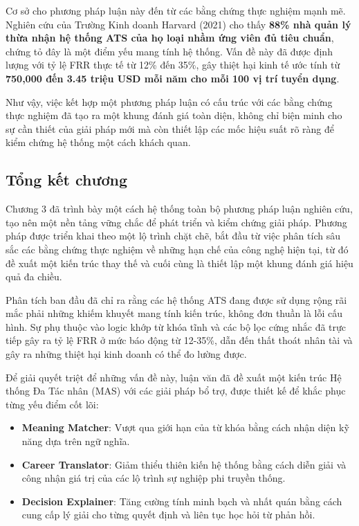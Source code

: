 \documentclass{article}
\begin{document}
Cơ sở cho phương pháp luận này đến từ các bằng chứng thực nghiệm mạnh mẽ. Nghiên cứu của Trường Kinh doanh Harvard (2021) cho thấy \textbf{88\% nhà quản lý thừa nhận hệ thống ATS của họ loại nhầm ứng viên đủ tiêu chuẩn}, chứng tỏ đây là một điểm yếu mang tính hệ thống. Vấn đề này đã được định lượng với tỷ lệ FRR thực tế từ 12\% đến 35\%, gây thiệt hại kinh tế ước tính từ \textbf{750,000 đến 3.45 triệu USD mỗi năm cho mỗi 100 vị trí tuyển dụng}.

Như vậy, việc kết hợp một phương pháp luận có cấu trúc với các bằng chứng thực nghiệm đã tạo ra một khung đánh giá toàn diện, không chỉ biện minh cho sự cần thiết của giải pháp mới mà còn thiết lập các mốc hiệu suất rõ ràng để kiểm chứng hệ thống một cách khách quan.

\subsection{Tổng kết chương}
Chương 3 đã trình bày một cách hệ thống toàn bộ phương pháp luận nghiên cứu, tạo nên một nền tảng vững chắc để phát triển và kiểm chứng giải pháp. Phương pháp được triển khai theo một lộ trình chặt chẽ, bắt đầu từ việc phân tích sâu sắc các bằng chứng thực nghiệm về những hạn chế của công nghệ hiện tại, từ đó đề xuất một kiến trúc thay thế và cuối cùng là thiết lập một khung đánh giá hiệu quả đa chiều.

Phân tích ban đầu đã chỉ ra rằng các hệ thống ATS đang được sử dụng rộng rãi mắc phải những khiếm khuyết mang tính kiến trúc, không đơn thuần là lỗi cấu hình. Sự phụ thuộc vào logic khớp từ khóa tĩnh và các bộ lọc cứng nhắc đã trực tiếp gây ra tỷ lệ FRR ở mức báo động từ 12-35\%, dẫn đến thất thoát nhân tài và gây ra những thiệt hại kinh doanh có thể đo lường được. 

Để giải quyết triệt để những vấn đề này, luận văn đã đề xuất một kiến trúc Hệ thống Đa Tác nhân (MAS) với các giải pháp bổ trợ, được thiết kế để khắc phục từng yếu điểm cốt lõi: 
\begin{itemize}[topsep=0pt, itemsep=4pt, leftmargin=40pt]
    \item \textbf{Meaning Matcher}: Vượt qua giới hạn của từ khóa bằng cách nhận diện kỹ năng dựa trên ngữ nghĩa.
    \item \textbf{Career Translator}: Giảm thiểu thiên kiến hệ thống bằng cách diễn giải và công nhận giá trị của các lộ trình sự nghiệp phi truyền thống.
    \item \textbf{Decision Explainer}: Tăng cường tính minh bạch và nhất quán bằng cách cung cấp lý giải cho từng quyết định và liên tục học hỏi từ phản hồi.
\end{itemize}
\end{document}
